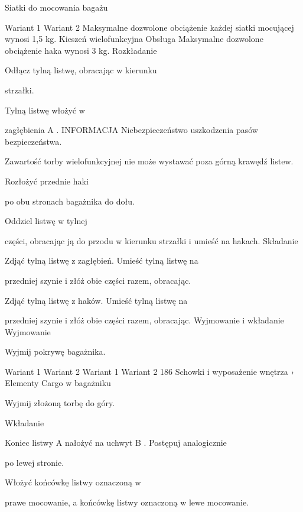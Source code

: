 Siatki do mocowania bagażu



Wariant 1
Wariant 2
Maksymalne dozwolone obciążenie każdej siatki mocującej wynosi 1,5 kg.
Kieszeń wielofunkcyjna
Obsługa
Maksymalne dozwolone obciążenie haka wynosi 3
kg.
Rozkładanie
\begin{itemizeArrow}
	\itemArrow Odłącz tylną listwę, obracając w kierunku
\end{itemizeArrow}
strzałki.
\begin{itemizeArrow}
	\itemArrow Tylną listwę włożyć w
\end{itemizeArrow}
zagłębienia A .
INFORMACJA
Niebezpieczeństwo uszkodzenia pasów bezpieczeństwa.
\begin{itemizeTriangle}
	\itemTriangle Zawartość torby wielofunkcyjnej nie może wystawać poza górną krawędź listew.
	\begin{itemizeArrow}
		\itemArrow Rozłożyć przednie haki
	\end{itemizeArrow}
\end{itemizeTriangle}
po obu stronach bagażnika do dołu.
\begin{itemizeArrow}
	\itemArrow Oddziel listwę w tylnej
\end{itemizeArrow}
części, obracając ją do
przodu w kierunku
strzałki i umieść na hakach.
Składanie
\begin{itemizeArrow}
	\itemArrow Zdjąć tylną listwę z zagłębień.
	\itemArrow Umieść tylną listwę na
\end{itemizeArrow}
przedniej szynie i złóż
obie części razem, obracając.
\begin{itemizeArrow}
	\itemArrow Zdjąć tylną listwę z haków.
	\itemArrow Umieść tylną listwę na
\end{itemizeArrow}
przedniej szynie i złóż
obie części razem, obracając.
Wyjmowanie i wkładanie
Wyjmowanie
\begin{itemizeArrow}
	\itemArrow Wyjmij pokrywę bagażnika.
\end{itemizeArrow}
Wariant 1
Wariant 2
Wariant 1
Wariant 2
186 Schowki i wyposażenie wnętrza › Elementy Cargo w bagażniku
\begin{itemizeArrow}
	\itemArrow Wyjmij złożoną torbę do góry.
\end{itemizeArrow}
Wkładanie
\begin{itemizeArrow}
	\itemArrow Koniec listwy A nałożyć na uchwyt B .
	\itemArrow Postępuj analogicznie
\end{itemizeArrow}
po lewej stronie.
\begin{itemizeArrow}
	\itemArrow Włożyć końcówkę listwy oznaczoną w
\end{itemizeArrow}
prawe mocowanie, a
końcówkę listwy oznaczoną w lewe mocowanie.


